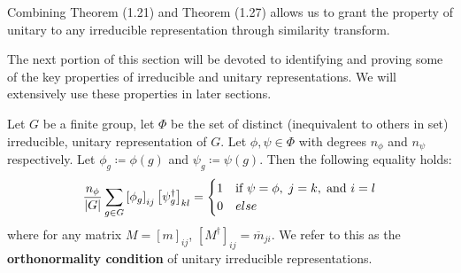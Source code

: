 \begin{remark}
	Combining Theorem (1.21) and Theorem (1.27) allows us to grant the property of unitary to any irreducible representation through similarity transform. 
\end{remark}

The next portion of this section will be devoted to identifying and proving some of the key properties of irreducible and unitary representations. We will extensively use these properties in later sections.

\begin{theorem}
	Let $G$ be a finite group, let $\Phi$ be the set of distinct (inequivalent to others in set) irreducible, unitary representation of $G$. Let $\phi,\psi \in \Phi$ with degrees $n_{\phi}$ and $n_{\psi}$ respectively. Let $\phi_g \coloneq \phi(g)$ and $\psi_g \coloneq \psi(g)$. Then the following equality holds:
$$\frac{n_\phi}{|G|} \sum_{g\in G} \left[\phi_g \right]_{ij} \left[\psi_g^\dag \right]_{kl} = \begin{cases}
																						1 & \text{if } \psi = \phi,\hspace{1mm} j=k,\hspace{1mm} \text{and } i=l\\
																						0 & else
																					 \end{cases}$$
where for any matrix $M=\left[m\right]_{ij}$, $\left[M^\dag\right]_{ij} = \overline{m}_{ji} $. We refer to this as the \textbf{orthonormality condition} of unitary irreducible representations.
\end{theorem}

